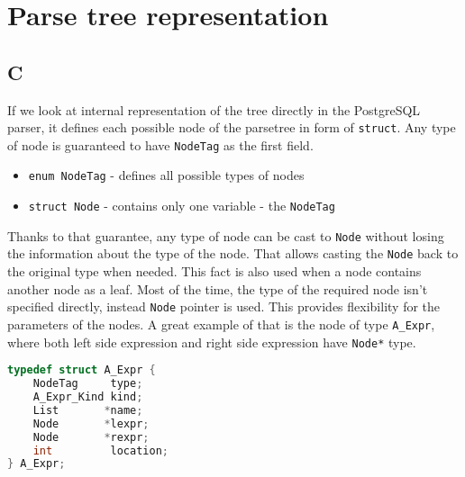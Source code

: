 \section{Parse tree representation}
\subsection{C}

If we look at internal representation of the tree directly in the PostgreSQL parser, it defines each possible node of the parsetree in form of \texttt{struct}. Any type of node is guaranteed to have \texttt{NodeTag} as the first field. 
\begin{itemize}
    \item \texttt{enum NodeTag} - defines all possible types of nodes
    \item \texttt{struct Node} - contains only one variable - the \texttt{NodeTag}
\end{itemize}
Thanks to that guarantee, any type of node can be cast to \texttt{Node} without losing the information about the type of the node. That allows casting the \texttt{Node} back to the original type when needed.
This fact is also used when a node contains another node as a leaf. Most of the time, the type of the required node isn't specified directly, instead \texttt{Node} pointer is used. This provides flexibility for the parameters of the nodes. A great example of that is the node of type \texttt{A\_Expr}, where both left side expression and right side expression have \texttt{Node*} type.
\begin{lstlisting}[language=C, basicstyle=\ttfamily]      
typedef struct A_Expr {
    NodeTag     type;
    A_Expr_Kind kind;
    List       *name; 
    Node       *lexpr; 
    Node       *rexpr; 
    int         location; 
} A_Expr;
\end{lstlisting}


